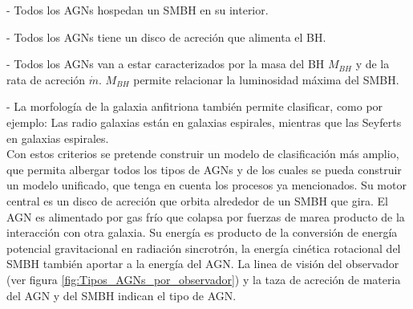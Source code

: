 


- Todos los AGNs hospedan un SMBH en su interior. 

- Todos los AGNs tiene un disco de acreción que alimenta el BH.

- Todos los AGNs van a estar caracterizados por la masa del BH $M_{BH}$ y de la rata de acreción $\dot{m}$. $M_{BH}$ permite relacionar la luminosidad máxima del SMBH. 

- La morfología de la galaxia anfitriona también permite clasificar, como por ejemplo: Las radio galaxias están en galaxias espirales, mientras que las Seyferts en galaxias espirales.\\

Con estos criterios se pretende construir un modelo de clasificación más amplio, que permita albergar todos los tipos de AGNs y de los cuales se pueda construir un modelo unificado, que tenga en cuenta los procesos ya mencionados. Su motor central es un disco de acreción que orbita alrededor de un SMBH que gira. El AGN es alimentado por gas frío que colapsa por fuerzas de marea producto de la interacción con otra galaxia. Su energía es producto de la conversión de energía potencial gravitacional en radiación sincrotrón, la energía cinética rotacional del SMBH también aportar a la energía del AGN. La linea de visión del observador (ver figura \ref{fig:Tipos_AGNs_por_observador}) y la taza de acreción de materia del AGN y del SMBH indican el tipo de AGN.  










